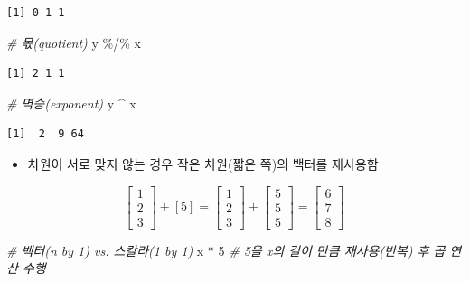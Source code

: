 \documentclass[
  11pt,
]{krantz}
\newenvironment{Shaded}{\begin{snugshade}}{\end{snugshade}}
\newcommand{\CommentTok}[1]{\textcolor[rgb]{0.37,0.37,0.37}{\textit{#1}}}
\newcommand{\DecValTok}[1]{\textcolor[rgb]{0.06,0.06,0.06}{#1}}
\newcommand{\NormalTok}[1]{#1}
\newcommand{\SpecialCharTok}[1]{\textcolor[rgb]{0,0,0}{#1}}
\providecommand{\tightlist}{%
  \setlength{\itemsep}{0pt}\setlength{\parskip}{0pt}}
\begin{document}
\begin{verbatim}
[1] 0 1 1
\end{verbatim}

\begin{Shaded}
\begin{Highlighting}[]
\CommentTok{\# 몫(quotient)}
\NormalTok{y }\SpecialCharTok{\%/\%}\NormalTok{ x}
\end{Highlighting}
\end{Shaded}

\begin{verbatim}
[1] 2 1 1
\end{verbatim}

\begin{Shaded}
\begin{Highlighting}[]
\CommentTok{\# 멱승(exponent)}
\NormalTok{y }\SpecialCharTok{\^{}}\NormalTok{ x}
\end{Highlighting}
\end{Shaded}

\begin{verbatim}
[1]  2  9 64
\end{verbatim}

\normalsize

\begin{itemize}
\tightlist
\item
  차원이 서로 맞지 않는 경우 작은 차원(짧은 쪽)의 백터를 재사용함
\end{itemize}

\[\begin{bmatrix}
1 \\ 2\\ 3
\end{bmatrix} + [5] = 
\begin{bmatrix}
1 \\ 2\\ 3
\end{bmatrix} + 
\begin{bmatrix}
5 \\ 5\\ 5
\end{bmatrix} = 
\begin{bmatrix}
6 \\ 7 \\ 8
\end{bmatrix}
\]

\footnotesize

\begin{Shaded}
\begin{Highlighting}[]
\CommentTok{\# 벡터(n by 1) vs. 스칼라(1 by 1)}
\NormalTok{x }\SpecialCharTok{*} \DecValTok{5} \CommentTok{\# 5을 x의 길이 만큼 재사용(반복) 후 곱 연산 수행}
\end{Highlighting}
\end{Shaded}
\end{document}
